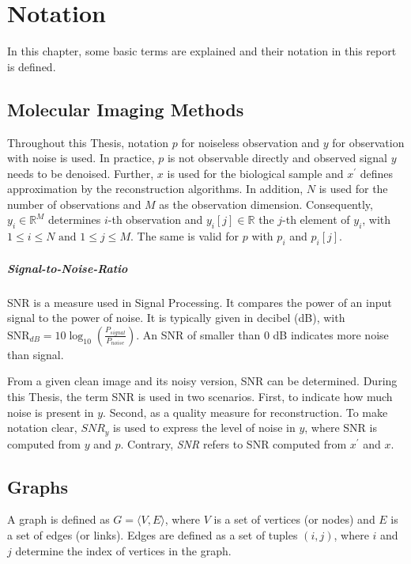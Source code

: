 \chapter{Notation}
\label{sec:notation}

In this chapter, some basic terms are explained and their notation in this report is defined.

\section{Molecular Imaging Methods}
Throughout this Thesis, notation $p$ for noiseless observation and $y$ for observation with noise is used.
In practice, $p$ is not observable directly and observed signal $y$ needs to be denoised.
Further, $x$ is used for the biological sample and $x^{\prime}$ defines approximation by the reconstruction algorithms.
In addition, $N$ is used for the number of observations and $M$ as the observation dimension.
Consequently, $y_i \in \mathbb{R}^M$ determines $i$-th observation and $y_i[j] \in \mathbb{R}$ the $j$-th element of $y_i$,
with $ 1 \leq i \leq N \text{ and } 1 \leq j \leq M$. The same is valid for $p$ with $p_i$ and $p_i[j]$. 


\paragraph{Signal-to-Noise-Ratio}
SNR is a measure used in Signal Processing. 
It compares the power of an input signal to the power of noise. It is typically given in decibel (dB), with
$\text{SNR}_{dB} = 10 \log_{10} \left(  \frac{P_{signal}}{P_{noise}} \right)$.
An SNR of smaller than 0 dB indicates more noise than signal.

From a given clean image and its noisy version, SNR can be determined.
During this Thesis, the term SNR is used  in two scenarios.
First, to indicate how much noise is present in $y$. Second, as a quality measure for reconstruction.
To make notation clear, $\textit{SNR}_y$ is used to express the level of noise in $y$, 
where SNR is computed from $y$ and $p$.
Contrary, \textit{SNR} refers to SNR computed from $x^{\prime}$ and $x$.

\section{Graphs}
A graph is defined as $G = \langle V,E \rangle$, where $V$ is a set of 
vertices (or nodes) and $E$ is a set of edges (or links). 
Edges are defined as a set of tuples $(i, j)$, where $i$ and $j$ determine 
the index of vertices in the graph.

